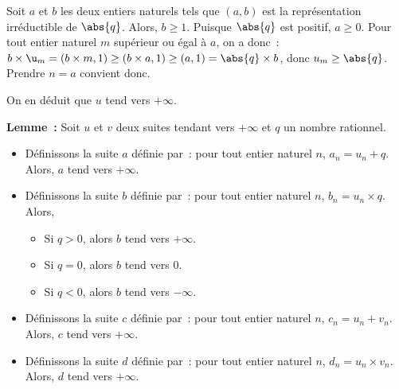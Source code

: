     Soit $a$ et $b$ les deux entiers naturels tels que $(a, b)$ est la représentation irréductible de $\abs{q}$.
    Alors, $b \geq 1$.
    Puisque $\abs{q}$ est positif, $a \geq 0$.
    Pour tout entier naturel $m$ supérieur ou égal à $a$, on a donc : $b \times \u_m = (b \times m, 1) \geq (b \times a, 1) \geq (a, 1) = \abs{q} \times b$, donc $u_m \geq \abs{q}$.
    Prendre $n = a$ convient donc.

    On en déduit que $u$ tend vers $+\infty$.
    
    \done

\medskip

\noindent\textbf{Lemme :} Soit $u$ et $v$ deux suites tendant vers $+\infty$ et $q$ un nombre rationnel.
    \begin{itemize}[nosep]
        \item Définissons la suite $a$ définie par : pour tout entier naturel $n$, $a_n = u_n + q$.
            Alors, $a$ tend vers $+\infty$.
        \item Définissons la suite $b$ définie par : pour tout entier naturel $n$, $b_n = u_n \times q$.
            Alors, 
            \begin{itemize}[nosep]
                \item Si $q > 0$, alors $b$ tend vers $+\infty$.
                \item Si $q = 0$, alors $b$ tend vers $0$.
                \item Si $q < 0$, alors $b$ tend vers $-\infty$.
            \end{itemize}
        \item Définissons la suite $c$ définie par : pour tout entier naturel $n$, $c_n = u_n + v_n$.
            Alors, $c$ tend vers $+\infty$.
        \item Définissons la suite $d$ définie par : pour tout entier naturel $n$, $d_n = u_n \times v_n$.
            Alors, $d$ tend vers $+\infty$.
    \end{itemize}

\medskip

